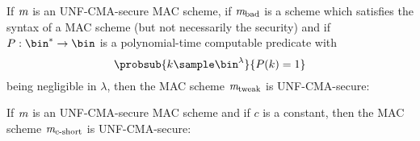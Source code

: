 \begin{theorem}
    If $\mathit{{m}}$ is an UNF-CMA-secure MAC scheme, if $\mathit{{m}}_{\text{bad}}$ is a scheme which satisfies the syntax of a MAC scheme
    (but not necessarily the security) and if $P:\bin^*\rightarrow\bin$ is a polynomial-time computable predicate with
    \[\probsub{k\sample\bin^\lambda}{P(k)=1}\]
    being negligible in $\lambda$, then the MAC scheme $\mathit{{m}}_{\text{tweak}}$ is UNF-CMA-secure:
    \begin{center}
        \begin{pchstack}
            \pchspace
        \end{pchstack}
    \end{center}
\end{theorem}

\begin{theorem}
    If $\mathit{{m}}$ is an UNF-CMA-secure MAC scheme and if $c$ is a constant, then the MAC scheme $\mathit{{m}}_{c\text{-short}}$ is UNF-CMA-secure:
    \begin{center}
        \begin{pchstack}
            \pchspace
        \end{pchstack}
    \end{center}
\end{theorem}
